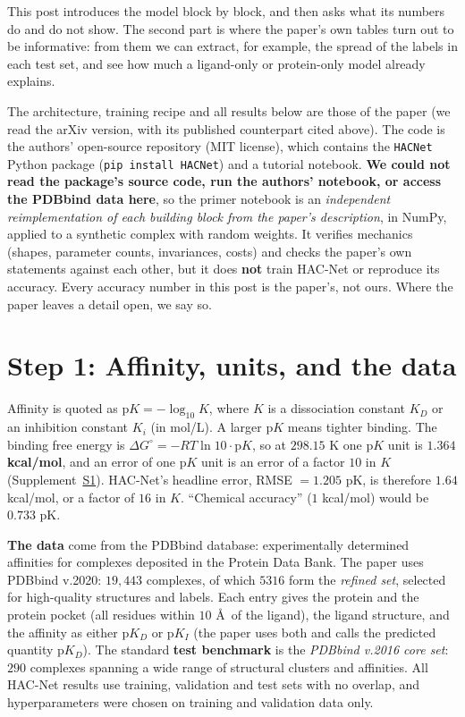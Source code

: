 \documentclass[11pt]{article}
\newcommand{\pK}{\mathrm{p}K}
\begin{document}
This post introduces the model block by block, and then asks what its numbers do and do not show. The second part is where the paper's own tables turn out to be informative: from them we can extract, for example, the spread of the labels in each test set, and see how much a ligand-only or protein-only model already explains.

\begin{keybox}
The architecture, training recipe and all results below are those of the paper (we read the arXiv version, with its published counterpart cited above). The code is the authors' open-source repository (MIT license), which contains the \texttt{HACNet} Python package (\texttt{pip install HACNet}) and a tutorial notebook. \textbf{We could not read the package's source code, run the authors' notebook, or access the PDBbind data here}, so the primer notebook is an \emph{independent reimplementation of each building block from the paper's description}, in NumPy, applied to a synthetic complex with random weights. It verifies mechanics (shapes, parameter counts, invariances, costs) and checks the paper's own statements against each other, but it does \textbf{not} train HAC-Net or reproduce its accuracy. Every accuracy number in this post is the paper's, not ours. Where the paper leaves a detail open, we say so.
\end{keybox}

\section{Step 1: Affinity, units, and the data}
Affinity is quoted as $\pK=-\log_{10}K$, where $K$ is a dissociation constant $K_D$ or an inhibition constant $K_i$ (in mol/L). A larger $\pK$ means tighter binding. The binding free energy is $\Delta G^\circ=-RT\ln10\cdot\pK$, so at $298.15$ K one $\pK$ unit is $\mathbf{1.364}$ \textbf{kcal/mol}, and an error of one $\pK$ unit is an error of a factor $10$ in $K$ (Supplement~\hyperref[sec:S1]{S1}). HAC-Net's headline error, RMSE $=1.205$ pK, is therefore $1.64$ kcal/mol, or a factor of $16$ in $K$. ``Chemical accuracy'' ($1$ kcal/mol) would be $0.733$ pK.

\textbf{The data} come from the PDBbind database: experimentally determined affinities for complexes deposited in the Protein Data Bank. The paper uses PDBbind v.2020: $19{,}443$ complexes, of which $5316$ form the \emph{refined set}, selected for high-quality structures and labels. Each entry gives the protein and the protein pocket (all residues within $10$ \AA\ of the ligand), the ligand structure, and the affinity as either $\pK_D$ or $\pK_I$ (the paper uses both and calls the predicted quantity $\pK_D$). The standard \textbf{test benchmark} is the \emph{PDBbind v.2016 core set}: $290$ complexes spanning a wide range of structural clusters and affinities. All HAC-Net results use training, validation and test sets with no overlap, and hyperparameters were chosen on training and validation data only.
\end{document}
